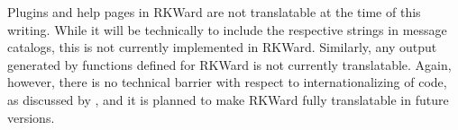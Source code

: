 Plugins and help pages in RKWard are not translatable at the time of this
writing. While it will be technically to include the respective strings in
message catalogs, this is not currently implemented in RKWard. Similarly, any
output generated by  functions defined for RKWard is not currently
translatable. Again, however, there is no technical barrier with respect to
internationalizing of  code, as discussed by \cite{Ripley2005a},
and it is planned to make RKWard fully translatable in future versions.
